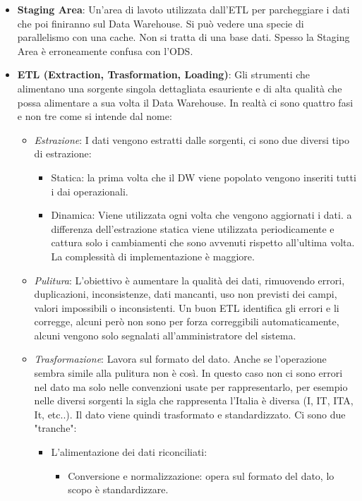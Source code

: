 \begin{itemize}
	\item \textbf{Staging Area}: Un'area di lavoto utilizzata dall'ETL per parcheggiare i dati che poi finiranno sul Data Warehouse. Si può vedere una specie di parallelismo con una cache. Non si tratta di una base dati. Spesso la Staging Area è erroneamente confusa con l’ODS.
	\item \textbf{ETL (Extraction, Trasformation, Loading)}: Gli strumenti che alimentano una sorgente singola dettagliata esauriente e di alta qualità che possa alimentare a sua volta il Data Warehouse. In realtà ci sono quattro fasi e non tre come si intende dal nome:
	\begin{itemize}
		\item \textit{Estrazione}: I dati vengono estratti dalle sorgenti, ci sono due diversi tipo di estrazione:
		\begin{itemize}
			\item Statica: la prima volta che il DW viene popolato vengono inseriti tutti i dai operazionali.
			\item Dinamica: Viene utilizzata ogni volta che vengono aggiornati i dati. a differenza dell'estrazione statica viene utilizzata periodicamente e cattura solo i cambiamenti che sono avvenuti rispetto all'ultima volta. La complessità di implementazione è maggiore.
		\end{itemize}
		\item \textit{Pulitura}: L'obiettivo è aumentare la qualità dei dati, rimuovendo errori, duplicazioni, inconsistenze, dati mancanti, uso non previsti dei campi, valori impossibili o inconsistenti. Un buon ETL identifica gli errori e li corregge, alcuni però non sono per forza correggibili automaticamente, alcuni vengono solo segnalati all'amministratore del sistema.
		\item \textit{Trasformazione}: Lavora sul formato del dato. Anche se l'operazione sembra simile alla pulitura non è così. In questo caso non ci sono errori nel dato ma solo nelle convenzioni usate per rappresentarlo, per esempio nelle diversi sorgenti la sigla che rappresenta l'Italia è diversa (I, IT, ITA, It, etc..). Il dato viene quindi trasformato e standardizzato.\newline
		Ci sono due "tranche":
		\begin{itemize}
			\item L'alimentazione dei dati riconciliati:
			\begin{itemize}
				\item Conversione e normalizzazione: opera sul formato del dato, lo scopo è standardizzare.

\end{itemize}
\end{itemize}
\end{itemize}
\end{itemize}
